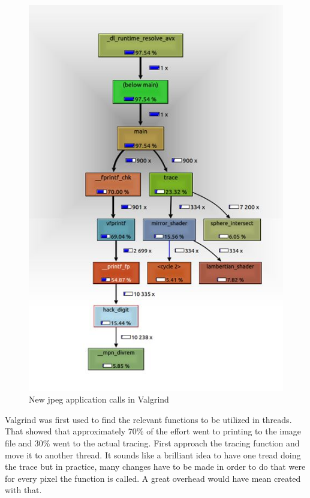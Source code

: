 \documentclass[journal]{IEEEtran}
\begin{document}
\begin{figure}[!h]
	\centering
	\includegraphics[width=.8\linewidth]{valgrind2}
	\caption{New jpeg application calls in Valgrind}
	\label{fig:valgrind2}
\end{figure}


Valgrind was first used to find the relevant functions to be utilized in threads. That showed that approximately 70\% of the effort went to printing to the image file and 30\% went to the actual tracing. First approach the tracing function and move it to another thread. It sounds like a brilliant idea to have one tread doing the trace but in practice, many changes have to be made in order to do that were for every pixel the function is called. A great overhead would have mean created with that.
\end{document}
